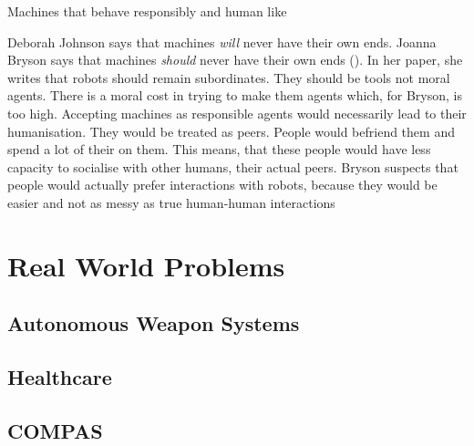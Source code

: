 \documentclass{article}
\newcounter{example}
\begin{document}
Machines that behave responsibly and human like 

Deborah Johnson says that machines \textit{will} never have their own ends.
Joanna Bryson says that machines \textit{should} never have their own ends
(\cite{bryson2010robots}). In her paper, she writes that robots should remain
subordinates. They should be tools not moral agents. There is a moral cost in
trying to make them agents which, for Bryson, is too high.
Accepting machines as responsible agents would necessarily lead to their
humanisation. They would be treated as peers. People would befriend them and
spend a lot of their  on them. This means, that these people
would have less capacity to socialise with other humans, their actual peers.
Bryson suspects that people would actually prefer interactions with robots,
because they would be easier and not as messy as true human-human interactions 



%
%
%
%

\section{Real World Problems}
\subsection{Autonomous Weapon Systems}
\subsection{Healthcare}
\subsection{COMPAS}
\end{document}

